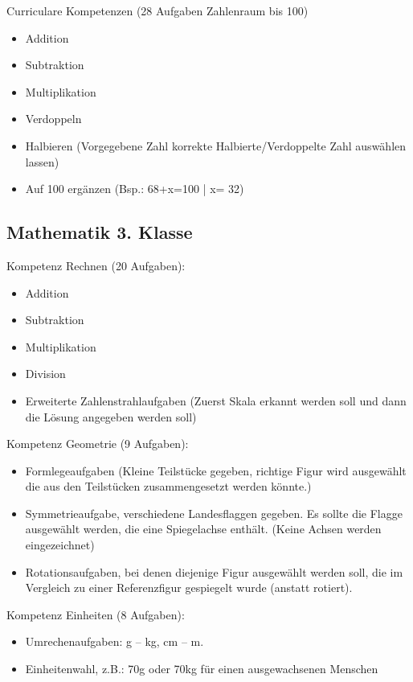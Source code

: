 \documentclass[12pt]{article}
\theoremstyle{definition}
\begin{document}
Curriculare Kompetenzen (28 Aufgaben Zahlenraum bis 100)
\begin{itemize}

    \item Addition
    \item Subtraktion
    \item Multiplikation
    \item Verdoppeln
    \item Halbieren (Vorgegebene Zahl korrekte Halbierte/Verdoppelte Zahl auswählen lassen)
    \item Auf 100 ergänzen (Bsp.: 68+x=100 | x= 32)
\end{itemize}

\subsection{Mathematik 3. Klasse}

Kompetenz Rechnen (20 Aufgaben): 

\begin{itemize}
    \item Addition
    \item Subtraktion
    \item Multiplikation
    \item Division
    \item Erweiterte Zahlenstrahlaufgaben (Zuerst Skala erkannt werden soll und dann die Lösung angegeben werden soll)
\end{itemize}
Kompetenz Geometrie (9 Aufgaben):
\begin{itemize}
    \item Formlegeaufgaben (Kleine Teilstücke gegeben, richtige Figur wird ausgewählt die aus den Teilstücken zusammengesetzt werden könnte.)

    \item Symmetrieaufgabe, verschiedene Landesflaggen gegeben. Es sollte die Flagge ausgewählt werden, die eine Spiegelachse enthält. (Keine Achsen werden eingezeichnet)

    \item Rotationsaufgaben, bei denen diejenige Figur ausgewählt werden soll, die im Vergleich zu einer Referenzfigur gespiegelt wurde (anstatt rotiert).

\end{itemize}
Kompetenz Einheiten (8 Aufgaben):

\begin{itemize}
    \item Umrechenaufgaben: g – kg, cm – m.  


    \item Einheitenwahl, z.B.: 70g oder 70kg für einen ausgewachsenen Menschen

\end{itemize}
\end{document}
